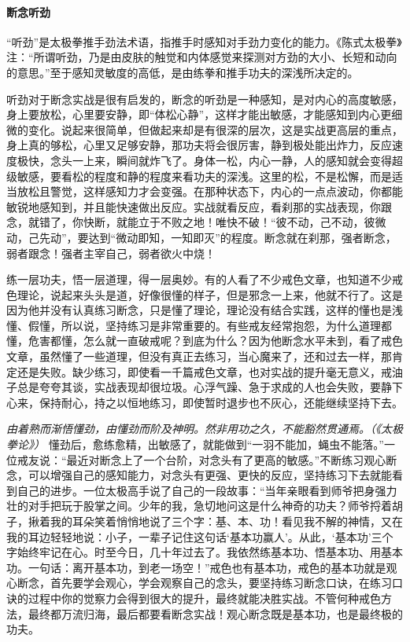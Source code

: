 \paragraph{断念听劲}

“听劲”是太极拳推手劲法术语，指推手时感知对手劲力变化的能力。《陈式太极拳》注：“所谓听劲，乃是由皮肤的触觉和内体感觉来探测对方劲的大小、长短和动向的意思。”至于感知灵敏度的高低，是由练拳和推手功夫的深浅所决定的。

听劲对于断念实战是很有启发的，断念的听劲是一种感知，是对内心的高度敏感，身上要放松，心里要安静，即“体松心静”，这样才能出敏感，才能感知到内心更细微的变化。说起来很简单，但做起来却是有很深的层次，这是实战更高层的重点，身上真的够松，心里又足够安静，那功夫将会很厉害，静到极处能出炸力，反应速度极快，念头一上来，瞬间就炸飞了。身体一松，内心一静，人的感知就会变得超级敏感，要看松的程度和静的程度来看功夫的深浅。这里的松，不是松懈，而是适当放松且警觉，这样感知力才会变强。在那种状态下，内心的一点点波动，你都能敏锐地感知到，并且能快速做出反应。实战就看反应，看刹那的实战表现，你跟念，就错了，你快断，就能立于不败之地！唯快不破！“彼不动，己不动，彼微动，己先动”，要达到“微动即知，一知即灭”的程度。断念就在刹那，强者断念，弱者跟念！强者主宰自己，弱者欲火中烧！

练一层功夫，悟一层道理，得一层奥妙。有的人看了不少戒色文章，也知道不少戒色理论，说起来头头是道，好像很懂的样子，但是邪念一上来，他就不行了。这是因为他并没有认真练习断念，只是懂了理论，理论没有结合实践，这样的懂也是浅懂、假懂，所以说，坚持练习是非常重要的。有些戒友经常抱怨，为什么道理都懂，危害都懂，怎么就一直破戒呢？到底为什么？因为他断念水平未到，看了戒色文章，虽然懂了一些道理，但没有真正去练习，当心魔来了，还和过去一样，那肯定还是失败。缺少练习，即使看一千篇戒色文章，也对实战的提升毫无意义，戒油子总是夸夸其谈，实战表现却很垃圾。心浮气躁、急于求成的人也会失败，要静下心来，保持耐心，持之以恒地练习，即使暂时退步也不灰心，还能继续坚持下去。

\textit{由着熟而渐悟懂劲，由懂劲而阶及神明。然非用功之久，不能豁然贯通焉。（《太极拳论》）} 懂劲后，愈练愈精，出敏感了，就能做到“一羽不能加，蝇虫不能落。”一位戒友说：“最近对断念上了一个台阶，对念头有了更高的敏感。”不断练习观心断念，可以增强自己的感知能力，对念头有更强、更快的反应，坚持练习下去就能看到自己的进步。一位太极高手说了自己的一段故事：“当年亲眼看到师爷把身强力壮的对手把玩于股掌之间。少年的我，急切地问这是什么神奇的功夫？师爷捋着胡子，揪着我的耳朵笑着悄悄地说了三个字：基、本、功！看见我不解的神情，又在我的耳边轻轻地说：小子，一辈子记住这句话‘基本功赢人’。从此，‘基本功’三个字始终牢记在心。时至今日，几十年过去了。我依然练基本功、悟基本功、用基本功。一句话：离开基本功，到老一场空！”戒色也有基本功，戒色的基本功就是观心断念，首先要学会观心，学会观察自己的念头，要坚持练习断念口诀，在练习口诀的过程中你的觉察力会得到很大的提升，最终就能决胜实战。不管何种戒色方法，最终都万流归海，最后都要看断念实战！观心断念既是基本功，也是最终极的功夫。

